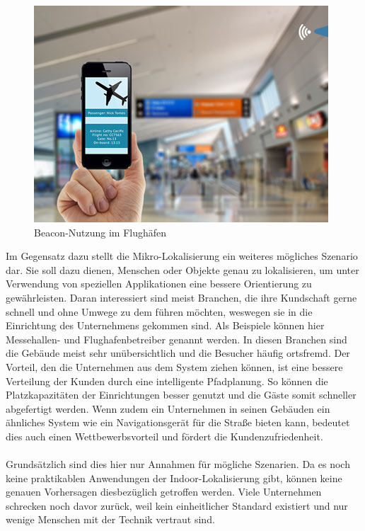 \begin{figure} 
\centering
\includegraphics[scale=0.5]{Bilder/iBeaconAirport}
\caption{Beacon-Nutzung im Flughäfen \cite{Airpo}}
\label{Airpo}
\end{figure}
Im Gegensatz dazu stellt die Mikro-Lokalisierung ein weiteres mögliches Szenario dar. Sie soll dazu dienen, Menschen oder Objekte genau zu lokalisieren, um unter Verwendung von speziellen Applikationen eine bessere Orientierung zu gewährleisten. Daran interessiert sind meist Branchen, die ihre Kundschaft gerne schnell und ohne Umwege zu dem führen möchten, weswegen sie in die Einrichtung des Unternehmens gekommen sind. Als Beispiele können hier Messehallen- und Flughafenbetreiber genannt werden. In diesen Branchen sind die Gebäude meist sehr unübersichtlich und die Besucher häufig ortsfremd. Der Vorteil, den die Unternehmen aus dem System ziehen können, ist eine bessere Verteilung der Kunden durch eine intelligente Pfadplanung. So können die Platzkapazitäten der Einrichtungen besser genutzt und die Gäste somit schneller abgefertigt werden. Wenn zudem ein Unternehmen in seinen Gebäuden ein ähnliches System wie ein Navigationsgerät für die Straße bieten kann, bedeutet dies auch einen Wettbewerbsvorteil und fördert die Kundenzufriedenheit. \\ \\
Grundsätzlich sind dies hier nur Annahmen für mögliche Szenarien. Da es noch keine praktikablen Anwendungen der Indoor-Lokalisierung gibt, können keine genauen Vorhersagen diesbezüglich getroffen werden. Viele Unternehmen schrecken noch davor zurück, weil kein einheitlicher Standard existiert und nur wenige Menschen mit der Technik vertraut sind. 
\newpage
